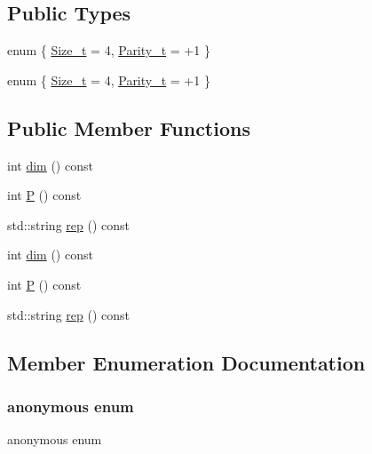 \subsection*{Public Types}
\begin{DoxyCompactItemize}
\item 
enum \{ \mbox{\hyperlink{structHadron_1_1J3o2gRep_a89d01f24d564fd740f3db2fabf326859a3173bbc08208abcc1458f7dee2f8fe58}{Size\+\_\+t}} = 4, 
\mbox{\hyperlink{structHadron_1_1J3o2gRep_a89d01f24d564fd740f3db2fabf326859ad9d63fa18ed0aa8ced82f5d5ea86b7dc}{Parity\+\_\+t}} = +1
 \}
\item 
enum \{ \mbox{\hyperlink{structHadron_1_1J3o2gRep_a89d01f24d564fd740f3db2fabf326859a3173bbc08208abcc1458f7dee2f8fe58}{Size\+\_\+t}} = 4, 
\mbox{\hyperlink{structHadron_1_1J3o2gRep_a89d01f24d564fd740f3db2fabf326859ad9d63fa18ed0aa8ced82f5d5ea86b7dc}{Parity\+\_\+t}} = +1
 \}
\end{DoxyCompactItemize}
\subsection*{Public Member Functions}
\begin{DoxyCompactItemize}
\item 
int \mbox{\hyperlink{structHadron_1_1J3o2gRep_af7221b9d11d215d51a39f93dc0dfaf88}{dim}} () const
\item 
int \mbox{\hyperlink{structHadron_1_1J3o2gRep_a52046d4b4dfe6708dfd95c7477fa09ae}{P}} () const
\item 
std\+::string \mbox{\hyperlink{structHadron_1_1J3o2gRep_a17dda74a4f77bec727e5d13b21917c8f}{rep}} () const
\item 
int \mbox{\hyperlink{structHadron_1_1J3o2gRep_af7221b9d11d215d51a39f93dc0dfaf88}{dim}} () const
\item 
int \mbox{\hyperlink{structHadron_1_1J3o2gRep_a52046d4b4dfe6708dfd95c7477fa09ae}{P}} () const
\item 
std\+::string \mbox{\hyperlink{structHadron_1_1J3o2gRep_a17dda74a4f77bec727e5d13b21917c8f}{rep}} () const
\end{DoxyCompactItemize}


\subsection{Member Enumeration Documentation}
\mbox{\label{structHadron_1_1J3o2gRep_a5745b15de1987fde8642b29ca09e8551}} 
\subsubsection{\texorpdfstring{anonymous enum}{anonymous enum}}
{\footnotesize\ttfamily anonymous enum}

